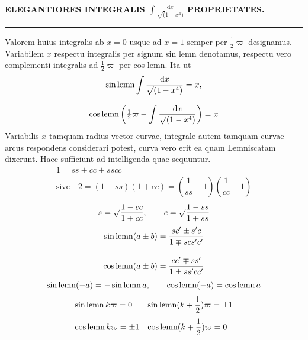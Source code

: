 \begin{center}
\textbf{ELEGANTIORES INTEGRALIS $\displaystyle\int\frac{\mathrm{d}x}{\surd(1-x^4)}$ PROPRIETATES.}
\end{center}
\par\begin{center}\rule{.22\linewidth}{.3pt}\end{center}
Valorem huius integralis ab $x=0$ usque ad $x=1$ semper per $\frac12\varpi$ designamus. Variabilem $x$ respectu integralis per signum sin lemn denotamus, respectu vero complementi integralis ad $\frac12\varpi$ per cos lemn. Ita ut
\[
\begin{gathered}\operatorname{sin\,lemn}\int\dfrac{\mathrm{d}x}{\surd(1-x^4)}=x,\\[8pt]
\operatorname{cos\,lemn}\left(\tfrac12\varpi-\int\dfrac{\mathrm{d}x}{\surd(1-x^4)}\right)=x\end{gathered}
\]
Variabilis $x$ tamquam radius vector curvae, integrale autem tamquam curvae arcus respondens considerari potest, curva vero erit ea quam Lemniscatam dixerunt. Haec sufficiunt ad intelligenda quae sequuntur.
\[
\begin{gathered}1=ss+cc+sscc\\[6pt]\text{sive}\quad
2=(1+ss)(1+cc)=\left(\dfrac1{ss}-1\right)\left(\dfrac1{cc}-1\right)\end{gathered}
\]
\[
s=\surd\dfrac{1-cc}{1+cc},\qquad c=\surd\dfrac{1-ss}{1+ss}
\]
\[
\begin{aligned}
\operatorname{sin\,lemn}(a\pm b)&=\dfrac{sc'\pm s'c}{1\mp scs'c'}\\[10pt]
\operatorname{cos\,lemn}(a\pm b)&=\dfrac{cc'\mp ss'}{1\pm ss'cc'}
\end{aligned}
\]
\[
\operatorname{sin\,lemn}(-a)=-\operatorname{sin\,lemn} a,\qquad \operatorname{cos\,lemn}(-a)=\operatorname{cos\,lemn} a
\]
\[
\begin{array}{ll}
\operatorname{sin\,lemn} k\varpi=0&\operatorname{sin\,lemn}(k+\dfrac12)\varpi=\pm1\\[10pt]
\operatorname{cos\,lemn} k\varpi=\pm1&\operatorname{cos\,lemn}(k+\dfrac12)\varpi=0
\end{array}
\]


